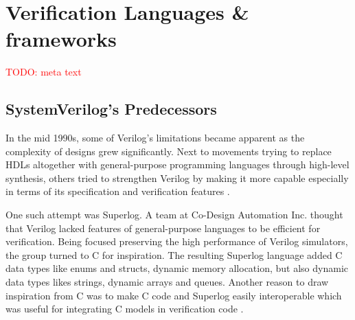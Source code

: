 \documentclass[11pt]{report}
\newcommand{\todo}[1]{\textcolor{red}{TODO: #1}}
\begin{document}
\begin{comment}

\cite[Ch. 1]{bergeron2005verification}
- transaction is an operation on an interface, as abstract as the transmission of a TCP package but also low level like an AXI bus write operation

\cite[Ch. 6]{bergeron2012writing}
- tb has two parts test harness and test case specific code
- harness is possible to reuse

- it is clear that

\cite[Ch. 3]{salemi2013uvm}
- BFM concerned with signal level -> first step towards transactions
- BFM encapsulates the protocols of an interface
- instead of driving signals, call methods which advance sim time while driving pins
- in SV this is implemented using the interface construct

\cite[Ch. 6]{bergeron2012writing}
- BFMs can be layered, where a higher level BFM calls a lower level BFM
- each BFM assumes correctness of some interaction with the DUT
- this can be demonstrated in one separate test such that all others can rely on this

\end{comment}

\section{Verification Languages \& frameworks} %

\todo{meta text}

\subsection{SystemVerilog's Predecessors} %

In the mid 1990s, some of Verilog's limitations became apparent as the complexity of designs grew significantly. Next
to movements trying to replace HDLs altogether with general-purpose programming languages through high-level
synthesis, others tried to strengthen Verilog by making it more capable especially in terms of its specification and
verification features \cite[Sec. 6]{flake2020a}.

One such attempt was Superlog. A team at Co-Design Automation Inc. thought that Verilog lacked features of
general-purpose languages to be efficient for verification. Being focused preserving the high performance of Verilog
simulators, the group turned to C for inspiration. The resulting Superlog language added C data types like enums and
structs, dynamic memory allocation, but also dynamic data types likes strings, dynamic arrays and queues. Another
reason to draw inspiration from C was to make C code and Superlog easily interoperable which was useful for
integrating C models in verification code \cite[Sec. 6]{flake2020a}.
\end{document}
